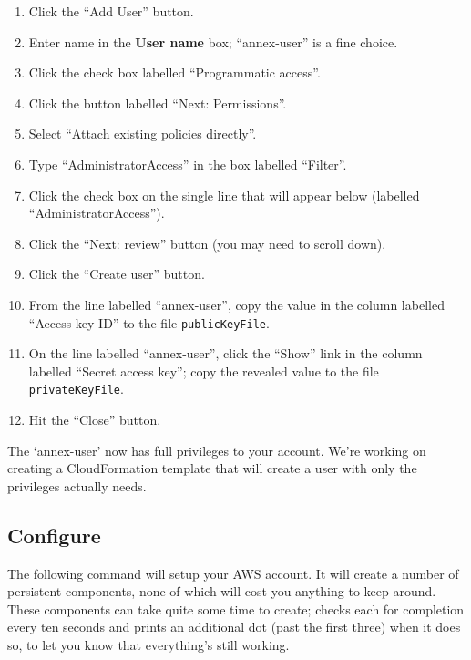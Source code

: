 \begin{enumerate}
\item Click the ``Add User'' button.
\item Enter name in the \textbf{User name} box; ``annex-user'' is a fine choice.
\item Click the check box labelled ``Programmatic access''.
\item Click the button labelled ``Next: Permissions''.
\item Select ``Attach existing policies directly''.
\item Type ``AdministratorAccess'' in the box labelled ``Filter''.
\item Click the check box on the single line that will appear below (labelled ``AdministratorAccess'').
\item Click the ``Next: review'' button (you may need to scroll down).
\item Click the ``Create user'' button.
\item From the line labelled ``annex-user'', copy the value in the column labelled ``Access key ID'' to the file \texttt{publicKeyFile}.
\item On the line labelled ``annex-user'', click the ``Show'' link in the column labelled ``Secret access key''; copy the revealed value to the file \texttt{privateKeyFile}.
\item Hit the ``Close'' button.
\end{enumerate}

The `annex-user' now has full privileges to your account.  We're working on
creating a CloudFormation template that will create a user with only the
privileges  actually needs.

\subsection{Configure }

The following command will setup your AWS account.  It will create a number
of persistent components, none of which will cost you anything to keep around.
These components can take quite some time to create;  checks
each for completion every ten seconds and prints an additional dot (past the
first three) when it does so, to let you know that everything's still working.


